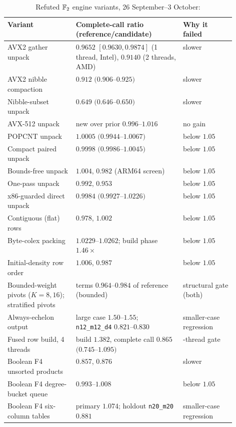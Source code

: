\begin{table}[t]
\centering\small
\begin{tabularx}{\linewidth}{@{}>{\raggedright}p{0.3\linewidth}>{\raggedright}X>{\raggedright\arraybackslash}p{0.23\linewidth}@{}}
\toprule
Variant & Complete-call ratio (reference/candidate) & Why it failed \\
\midrule
AVX2 gather unpack & $0.9652$ $[0.9630,0.9874]$ (1 thread, Intel), $0.9140$ (2 threads, AMD) & slower \\
AVX2 nibble compaction & $0.912$ $(0.906$--$0.925)$ & slower \\
Nibble-subset unpack & $0.649$ $(0.646$--$0.650)$ & slower \\
AVX-512 unpack & new over prior $0.996$--$1.016$ & no gain \\
POPCNT unpack & $1.0005$ $(0.9944$--$1.0067)$ & below $1.05$ \\
Compact paired unpack & $0.9998$ $(0.9986$--$1.0045)$ & below $1.05$ \\
Bounds-free unpack & $1.004$, $0.982$ (ARM64 screen) & below $1.05$ \\
One-pass unpack & $0.992$, $0.953$ & below $1.05$ \\
x86-guarded direct unpack & $0.9984$ $(0.9927$--$1.0226)$ & below $1.05$ \\
Contiguous (flat) rows & $0.978$, $1.002$ & below $1.05$ \\
Byte-colex packing & $1.0229$--$1.0262$; build phase $1.46\times$ & below $1.05$ \\
Initial-density row order & $1.006$, $0.987$ & below $1.05$ \\
Bounded-weight pivots ($K=8,16$); stratified pivots & terms $0.964$--$0.984$ of reference (bounded) & structural gate (both) \\
Always-echelon output & large case $1.50$--$1.55$; \texttt{n12\_m12\_d4} $0.821$--$0.830$ & smaller-case regression \\
Fused row build, 4 threads & build $1.382$, complete call $0.865$ $(0.745$--$1.095)$ & 4-thread gate \\
Boolean F4 unsorted products & $0.857$, $0.876$ & slower \\
Boolean F4 degree-bucket queue & $0.993$--$1.008$ & below $1.05$ \\
Boolean F4 six-column tables & primary $1.074$; holdout \texttt{n20\_m20} $0.881$ & smaller-case regression \\
\bottomrule
\end{tabularx}
\caption[]{Refuted $\mathbb{F}_2$ engine variants, 26 September--3 October:
}
\end{table}
